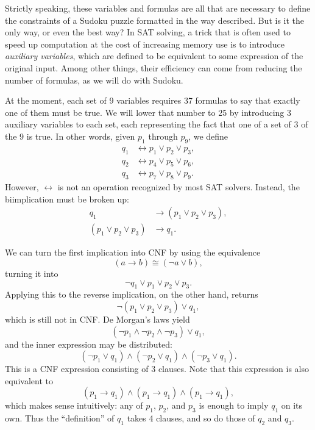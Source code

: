 \documentclass{article}
\begin{document}
Strictly speaking, these variables and formulas are all that are necessary
to define the constraints of a Sudoku puzzle
formatted in the way described.
But is it the only way, or even the best way?
In SAT solving, a trick that is often used to speed up computation
at the cost of increasing memory use
is to introduce \textit{auxiliary variables},
which are defined to be equivalent to some expression of the original input.
Among other things,
their efficiency can come from reducing the number of formulas,
as we will do with Sudoku.

At the moment, each set of 9 variables requires 37 formulas
to say that exactly one of them must be true.
We will lower that number to 25
by introducing 3 auxiliary variables to each set,
each representing the fact that
one of a set of 3 of the 9 is true.
In other words, given $p_1$ through $p_9$,
we define
\begin{align*}
  q_1 &\leftrightarrow p_1 \lor p_2 \lor p_3, \\
  q_2 &\leftrightarrow p_4 \lor p_5 \lor p_6, \\
  q_3 &\leftrightarrow p_7 \lor p_8 \lor p_9.
\end{align*}
However, $\leftrightarrow$ is not an operation recognized by most SAT solvers.
Instead, the biimplication must be broken up:
\begin{align*}
  q_1 &\rightarrow (p_1 \lor p_2 \lor p_3), \\
  (p_1 \lor p_2 \lor p_3) &\rightarrow q_1.
\end{align*}

We can turn the first implication into CNF
by using the equivalence
\[(a \rightarrow b) \cong (\lnot a \lor b),\]
turning it into
\[\lnot q_1 \lor p_1 \lor p_2 \lor p_3.\]
Applying this to the reverse implication, on the other hand, returns
\[\lnot (p_1 \lor p_2 \lor p_3) \lor q_1,\]
which is still not in CNF.
De Morgan's laws yield
\[(\lnot p_1 \land \lnot p_2 \land \lnot p_3) \lor q_1,\]
and the inner expression may be distributed:
\[(\lnot p_1 \lor q_1) \land (\lnot p_2 \lor q_1) \land (\lnot p_3 \lor q_1).\]
This is a CNF expression consisting of 3 clauses.
Note that this expression is also equivalent to
\[(p_1 \rightarrow q_1) \land (p_1 \rightarrow q_1) \land (p_1 \rightarrow q_1),\]
which makes sense intuitively:
any of $p_1$, $p_2$, and $p_3$ is enough to imply $q_1$ on its own.
Thus the ``definition'' of $q_1$ takes 4 clauses,
and so do those of $q_2$ and $q_3$.
\end{document}
